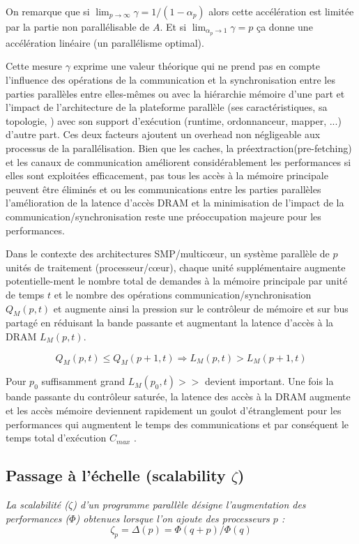 On remarque que si $\lim_{p \to \infty} \gamma = 1/(1-\alpha_p)$ alors cette accélération est limitée par la partie non parallélisable de $A$. Et si $\lim_{\alpha_p \to 1} \gamma = p$ ça donne une accélération linéaire (un parallélisme optimal).

Cette mesure $\gamma$ exprime une valeur théorique qui ne prend pas en compte l'influence des opérations de la communication et la synchronisation entre les parties parallèles entre elles-mêmes ou avec la hiérarchie mémoire d'une part et l'impact de l'architecture de la plateforme parallèle (ses caractéristiques, sa topologie, ) avec son support d'exécution (runtime, ordonnanceur, mapper, ...) d'autre part. Ces deux facteurs ajoutent un overhead non négligeable aux processus de la parallélisation. 
Bien que les caches, la préextraction(pre-fetching) et les canaux de communication améliorent considérablement les performances si elles sont exploitées efficacement, pas tous les accès à la mémoire principale peuvent être éliminés et ou les communications entre les parties parallèles l'amélioration de la latence d'accès DRAM et la minimisation de l'impact de la communication/synchronisation reste une préoccupation majeure pour les performances.

Dans le contexte des architectures SMP/multicœur,
un système parallèle de $p$ unités de traitement (processeur/cœur), chaque unité supplémentaire augmente potentielle-ment le nombre total de demandes à la mémoire principale par unité de temps $t$ et le nombre des opérations communication/synchronisation $Q_M(p,t)$ et augmente ainsi la pression sur le contrôleur de mémoire et sur bus partagé en réduisant la bande passante et augmentant la latence d'accès à la DRAM $L_M(p,t)$. 

$$Q_M(p,t) \leq Q_M(p+1,t) \Rightarrow L_M(p,t) > L_M(p+1, t)$$

Pour $p_0$ suffisamment grand $L_M(p_0, t) >>$ devient important. Une fois la bande passante du contrôleur saturée, la latence des accès à la DRAM augmente et les accès mémoire deviennent rapidement un goulot d'étranglement pour les performances qui augmentent le temps des communications et par conséquent le temps total d'exécution $C_{max}$ .\\
%
\subsection{Passage à l’échelle (scalability $\zeta$)}
%
\begin{définition}\textit{
%
La scalabilité ($\zeta$) d’un programme parallèle désigne l’augmentation des performances ($\Phi$) obtenues lorsque l’on ajoute des processeurs $p$ : 
$$\zeta_p =\Delta(p) = \Phi(q+p)/\Phi(q)$$
%
}\end{définition}

